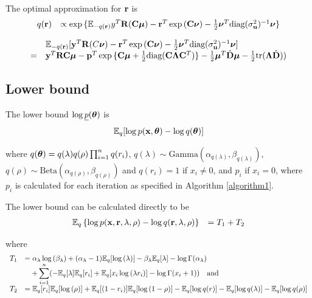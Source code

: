 \documentclass{article}[12pt]
\begin{document}

\noindent The optimal approximation for ${\bf r}$ is
$$
\begin{array}{rl}
q({\bf r}) &\propto \exp{\{{\mathbb E}_{-q({\bf r})}y^T{\bf R}({\bf C}{\boldsymbol\mu}) - {\bf r}^T\exp{({\bf C}{\boldsymbol\nu})}-{\frac{1}{2}}{\boldsymbol\nu}^T \text{diag}(\sigma_{{\bf u}}^2)^{-1} {\boldsymbol\nu}\}}
\end{array}
$$

$$
\begin{array}{rl}
&{\mathbb E}_{-q({\bf r})} [{\bf y}^T{\bf R}(C{\boldsymbol \nu}) - {\bf r}^T\exp{({\bf C}{\boldsymbol\nu})}-{\frac{1}{2}} {\boldsymbol \nu}^T \text{diag}(\sigma_{{\bf u}}^2)^{-1} {\boldsymbol \nu}]\\
=&{\bf y}^T{\bf R}{\bf C} {\boldsymbol \mu} - {\bf p}^T \exp{\{{\bf C}{\boldsymbol\mu}+ {\frac{1}{2}}\text{diag}({\bf C}{\boldsymbol\Lambda}{\bf C}^T)\}} - {\frac{1}{2}} {\boldsymbol \mu}^T \hat{{\bf D}} {\boldsymbol \mu} - {\frac{1}{2}} \text{tr}({\boldsymbol \Lambda} \hat{{\bf D}} ))
\end{array}
$$

\subsection{Lower bound}
The lower bound $\log{\underline{p}({\boldsymbol\theta})}$ is
$$
	{\mathbb E}_q[\log{p({\bf x}, {\boldsymbol\theta})} - \log{q({\boldsymbol\theta})}]
$$

\noindent where $q({\boldsymbol \theta}) = q(\lambda) q(\rho) \prod_{i=1}^n q(r_i)$,
$q(\lambda) \sim \text{Gamma}{(\alpha_{q(\lambda)}, \beta_{q(\lambda)})}$,
$q(\rho) \sim \text{Beta}(\alpha_{q(\rho)}, \beta_{q(\rho)})$ and
$q(r_i) = 1$ if $x_i \ne 0$, and $p_i$ if $x_i = 0$, where $p_i$ is
calculated for each iteration as specified in Algorithm \ref{algorithm1}.

The lower bound can be calculated directly to be
$$
\begin{array}{rl}
{\mathbb E}_q \left\{ \log{p({\bf x}, {\bf r}, \lambda, \rho)} - \log{q({\bf r}, \lambda, \rho)} \right\} &= T_1 + T_2 \\
\end{array}
$$

\noindent where
$$
\begin{array}{rl}
T_1 & \displaystyle =
\alpha_\lambda \log{(\beta_\lambda)} + (\alpha_\lambda - 1) {\mathbb E}_q[\log{(\lambda)}] - \beta_\lambda {\mathbb E}_q [\lambda] - \log\Gamma(\alpha_\lambda) \\
& \displaystyle \quad + \sum_{i=1}^n ( -{\mathbb E}_q [\lambda] {\mathbb E}_q [r_i] + {\mathbb E}_q[x_i \log{(\lambda r_i)}] - \log\Gamma(x_i+1)) \quad \mbox{and}
\\ [1ex]
T_2 &={\mathbb E}_q[r_i] {\mathbb E}_q[\log{(\rho)}] + {\mathbb E}_q[(1 - r_i)] {\mathbb E}_q[\log{(1 - \rho)}] 
- {\mathbb E}_q[\log{q(r)}] 
- {\mathbb E}_q[\log{q(\lambda)}] 
- {\mathbb E}_q[ \log{q(\rho)}]
\end{array}
$$
\end{document}
